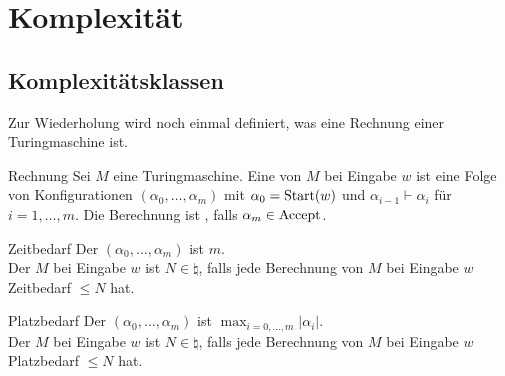 \section{%
    Komplexität%
}

\subsection{%
    Komplexitätsklassen%
}

\begin{Bem}
    Zur Wiederholung wird noch einmal definiert, was eine Rechnung einer Turingmaschine ist.
\end{Bem}

\begin{Def}{Rechnung}
    Sei $M$ eine Turingmaschine.
    Eine  von $M$ bei Eingabe $w$ ist eine Folge von Konfigurationen
    $(\alpha_0, \dotsc, \alpha_m)$ mit $\alpha_0 = \text{Start}(w)$ und $\alpha_{i-1} \vdash \alpha_i$
    für $i = 1, \dotsc, m$.
    Die Berechnung ist , falls $\alpha_m \in \text{Accept}$.
\end{Def}

\begin{Def}{Zeitbedarf}
    Der  $(\alpha_0, \dotsc, \alpha_m)$ ist $m$.\\
    Der  $M$ bei Eingabe $w$ ist
    $N \in \natural$, falls jede Berechnung von $M$ bei Eingabe $w$ Zeitbedarf $\le N$ hat.
\end{Def}

\begin{Def}{Platzbedarf}
    Der  $(\alpha_0, \dotsc, \alpha_m)$ ist
    $\max_{i = 0, \dotsc, m} |\alpha_i|$.\\
    Der  $M$ bei Eingabe $w$ ist
    $N \in \natural$, falls jede Berechnung von $M$ bei Eingabe $w$ Platzbedarf $\le N$ hat.
\end{Def}

\linie

